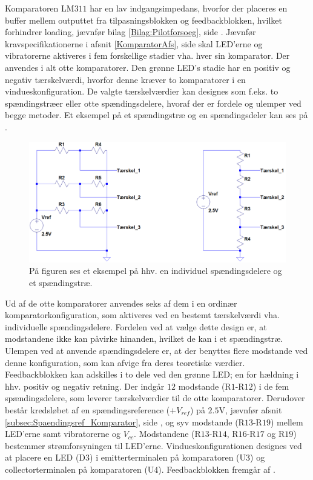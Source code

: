 \noindent Komparatoren LM$311$ har en lav indgangsimpedans, hvorfor der placeres en buffer mellem outputtet fra tilpasningsblokken og feedbackblokken, hvilket forhindrer loading, jævnfør bilag \ref{Bilag:Pilotforsoeg}, side \pageref{Bilag:Pilotforsoeg} \cite{Instruments2015}. Jævnfør kravspecifikationerne i afsnit \ref{KomparatorAfs}, side \pageref{KomparatorAfs} skal LED'erne og vibratorerne aktiveres i fem forskellige stadier vha. hver sin komparator. Der anvendes i alt otte komparatorer. Den grønne LED's stadie har en positiv og negativ tærskelværdi, hvorfor denne kræver to komparatorer i en vindueskonfiguration. De valgte tærskelværdier kan designes som f.eks. to spændingstræer eller otte spændingsdelere, hvoraf der er fordele og ulemper ved begge metoder. Et eksempel på et spændingstræ og en spændingsdeler kan ses på . 
\begin{figure}[H] 
	\centering
	\includegraphics[scale=0.4]{figures/cProblemloesning/eksempel_speadingstrae.PNG}
	\caption{På figuren ses et eksempel på hhv. en individuel spændingsdelere og et spændingstræ.}
	\label{fig:spaendingstrae}
\end{figure}
\noindent Ud af de otte komparatorer anvendes seks af dem i en ordinær komparatorkonfiguration, som aktiveres ved en bestemt tærskelværdi vha. individuelle spændingsdelere. Fordelen ved at vælge dette design er, at modstandene ikke kan påvirke hinanden, hvilket de kan i et spændingstræ. Ulempen ved at anvende spændingsdelere er, at der benyttes flere modstande ved denne konfiguration, som kan afvige fra deres teoretiske værdier.\\
Feedbackblokken kan adskilles i to dele ved den grønne LED; en for hældning i hhv. positiv og negativ retning. Der indgår $12$ modstande (R$1$-R$12$) i de fem spændingsdelere, som leverer tærskelværdier til de otte komparatorer. Derudover består kredsløbet af en spændingsreference ($+V_{ref}$) på $2.5$V, jævnfør afsnit \ref{subsec:Spaendingsref_Komparator}, side \pageref{subsec:Spaendingsref_Komparator}, og syv modstande (R$13$-R$19$) mellem LED'erne samt vibratorerne og $V_{cc}$. Modstandene (R$13$-R$14$, R$16$-R$17$ og R$19$) bestemmer strømforsyningen til LED'erne. Vindueskonfigurationen designes ved at placere en LED (D$3$) i emitterterminalen på komparatoren (U$3$) og collectorterminalen på komparatoren (U$4$). Feedbackblokken fremgår af . 

